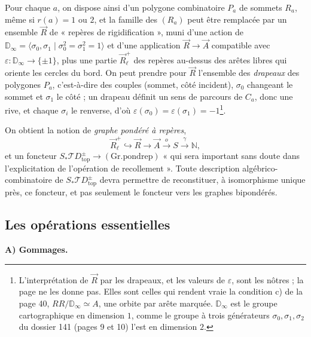 \documentclass[11pt,a4paper]{article}
\begin{document}
Pour chaque $a$, on dispose ainsi d'un polygone combinatoire $P_a$ de sommets
$R_a$, même si $r(a) = 1$ ou $2$, et la famille des $(R_a)$ peut être
remplacée par un ensemble $\vec{R}$ de « repères de rigidification », muni d'une
action de $\mathbb{D}_\infty = \langle \sigma_0, \sigma_1 \mid \sigma_0^2 =
\sigma_1^2 = 1\rangle$ et d'une application $\vec{R} \to \vec{A}$ compatible avec
$\varepsilon : \mathbb{D}_\infty \to \{\pm 1\}$, plus une partie $\vec{R}^{+}_\ell$
des repères au-dessus des arêtes libres qui oriente les cercles du bord. On peut
prendre pour $\vec{R}$ l'ensemble des \emph{drapeaux} des polygones $P_a$,
c'est-à-dire des couples (sommet, côté incident), $\sigma_0$ changeant le sommet et $\sigma_1$
le côté ; un drapeau définit un sens de parcours de $C_a$, donc une rive, et
chaque $\sigma_i$ le renverse, d'où $\varepsilon(\sigma_0) = \varepsilon(\sigma_1)
= -1$\footnote{L'interprétation de $\vec{R}$ par les drapeaux, et les valeurs de
$\varepsilon$, sont les nôtres ; la page ne les donne pas. Elles sont celles qui
rendent vraie la condition c) de la page 40, $RR/\mathbb{D}_\infty \simeq A$, une
orbite par arête marquée. $\mathbb{D}_\infty$ est le groupe cartographique en
dimension $1$, comme le groupe à trois générateurs $\sigma_0, \sigma_1, \sigma_2$
du dossier 141 (pages 9 et 10) l'est en dimension $2$.}.

On obtient la notion de \emph{graphe pondéré à repères},
\[
\vec{R}^{+}_\ell \hookrightarrow \vec{R} \longrightarrow \vec{A}
\xrightarrow{\ o\ } S \xrightarrow{\ \gamma\ } \mathbb{N},
\]
et un foncteur $S_{*}\mathcal{T}D^{\pm}_{\mathrm{top}} \to (\mathrm{Gr.pondrep})$
« qui sera important sans doute dans l'explicitation de l'opération de
recollement ». Toute description algébrico-combinatoire de
$S_{*}\mathcal{T}D^{\pm}_{\mathrm{top}}$ devra permettre de reconstituer, à
isomorphisme unique près, ce foncteur, et pas seulement le foncteur vers les
graphes bipondérés.

\subsection*{Les opérations essentielles}

\textbf{A) Gommages.}
\end{document}
